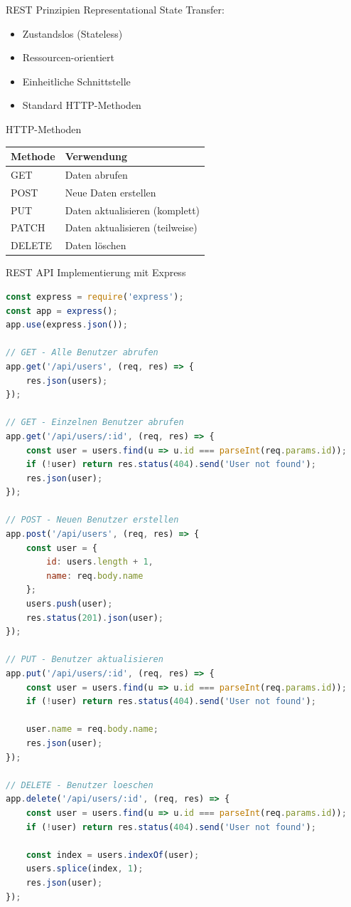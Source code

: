 \begin{definition}{REST Prinzipien}
    Representational State Transfer:
    \begin{itemize}
        \item Zustandslos (Stateless)
        \item Ressourcen-orientiert
        \item Einheitliche Schnittstelle
        \item Standard HTTP-Methoden
    \end{itemize}
\end{definition}

\begin{theorem}{HTTP-Methoden}
    \begin{center}
    \begin{tabular}{|l|l|}
    \hline
    Methode & Verwendung \\
    \hline
    GET & Daten abrufen \\
    \hline
    POST & Neue Daten erstellen \\
    \hline
    PUT & Daten aktualisieren (komplett) \\
    \hline
    PATCH & Daten aktualisieren (teilweise) \\
    \hline
    DELETE & Daten löschen \\
    \hline
    \end{tabular}
    \end{center}
\end{theorem}

\begin{KR}{REST API Implementierung mit Express}
\begin{lstlisting}[language=JavaScript, style=basesmol]
const express = require('express');
const app = express();
app.use(express.json());

// GET - Alle Benutzer abrufen
app.get('/api/users', (req, res) => {
    res.json(users);
});

// GET - Einzelnen Benutzer abrufen
app.get('/api/users/:id', (req, res) => {
    const user = users.find(u => u.id === parseInt(req.params.id));
    if (!user) return res.status(404).send('User not found');
    res.json(user);
});

// POST - Neuen Benutzer erstellen
app.post('/api/users', (req, res) => {
    const user = {
        id: users.length + 1,
        name: req.body.name
    };
    users.push(user);
    res.status(201).json(user);
});

// PUT - Benutzer aktualisieren
app.put('/api/users/:id', (req, res) => {
    const user = users.find(u => u.id === parseInt(req.params.id));
    if (!user) return res.status(404).send('User not found');
    
    user.name = req.body.name;
    res.json(user);
});

// DELETE - Benutzer loeschen
app.delete('/api/users/:id', (req, res) => {
    const user = users.find(u => u.id === parseInt(req.params.id));
    if (!user) return res.status(404).send('User not found');
    
    const index = users.indexOf(user);
    users.splice(index, 1);
    res.json(user);
});
\end{lstlisting}
\end{KR}

